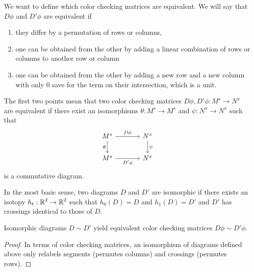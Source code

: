 We want to define which color checking matrices are equivalent. We will say that $D\phi$ and $D'\phi$ are equivalent if 
\begin{enumerate}
  \item they differ by a permutation of rows or columns, 
  \item one can be obtained from the other by adding a linear combination of rows or columns to another row or column 
  \item one can be obtained from the other by adding a new row and a new column with only $0$ save for the term on their intersection, which is a unit.
\end{enumerate}
The first two points mean that two color checking matrices $D\phi, D'\phi:M^s\to N^x$ are equivalent if there exist an isomorphisms $\theta:M^s\to M^s$ and $\psi:N^x\to N^x$ such that
$$
\begin{tikzcd}[column sep=large]
  M^s\arrow[r, "D\phi"]\arrow[d, "\theta" left] & N^x\arrow[d, "\psi" right]\\ 
  M^s\arrow[r, "D'\phi" below] & N^x
\end{tikzcd}
$$
is a commutative diagram. 

In the most basic sense, two diagrams $D$ and $D'$ are isomorphic if there exists an isotopy $h_t:\operatorname{\mathbb{R}}^2\to \operatorname{\mathbb{R}}^2$ such that $h_0(D)=D$ and $h_1(D)=D'$ and $D'$ has crossings identical to those of $D$.

\begin{lemma}
  Isomorphic diagrams $D\sim D'$ yield equivalent color checking matrices $D\phi\sim D'\phi$.
\end{lemma}

\begin{proof}
  In terms of color checking matrices, an isomorphism of diagrams defined above only relabels segments (permutes columns) and crossings (permutes rows).
\end{proof}










